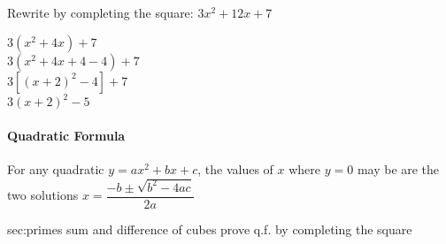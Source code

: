 \begin{example}
\exProblem
Rewrite by completing the square: $3x^2 + 12x + 7$

\exSolution
$3(x^2+4x) + 7$\\
$3(x^2+4x+4-4) + 7$\\
$3[(x+2)^2-4] + 7$\\
$3(x+2)^2-5$
\end{example}

\paragraph{Quadratic Formula}
For any quadratic $y=ax^2+bx+c$, the values of $x$ where $y=0$ may be are the two solutions
$x=\dfrac{-b\pm\sqrt{b^2-4ac}}{2a}$


\ExSection[Exercises]
\begin{exercises}{sec:primes}
\prob{}sum and difference of cubes
\prob{}prove q.f. by completing the square

\end{exercises}